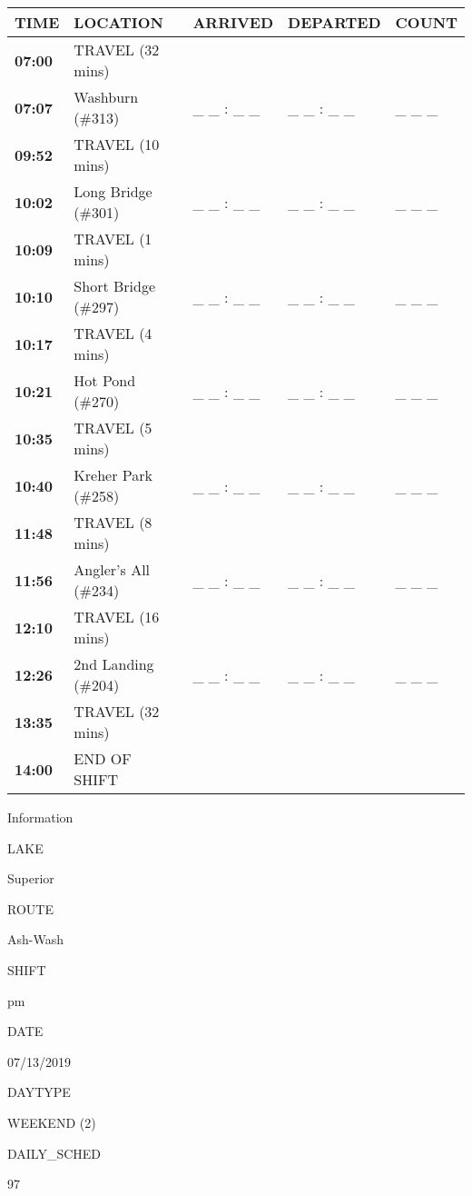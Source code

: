 \documentclass[]{article}
\begin{document}
\begin{tabular}{>{\bfseries}lllll}
\toprule
\textbf{TIME} & \textbf{LOCATION} & \textbf{ARRIVED} & \textbf{DEPARTED} & \textbf{COUNT}\\
\midrule
07:00 & TRAVEL (32 mins) &  &  & \\
07:07 & Washburn (\#313) & \_ \_ : \_ \_ & \_ \_ : \_ \_ & \_ \_ \_\\
09:52 & TRAVEL (10 mins) &  &  & \\
10:02 & Long Bridge (\#301) & \_ \_ : \_ \_ & \_ \_ : \_ \_ & \_ \_ \_\\
10:09 & TRAVEL (1 mins) &  &  & \\
10:10 & Short Bridge (\#297) & \_ \_ : \_ \_ & \_ \_ : \_ \_ & \_ \_ \_\\
10:17 & TRAVEL (4 mins) &  &  & \\
10:21 & Hot Pond (\#270) & \_ \_ : \_ \_ & \_ \_ : \_ \_ & \_ \_ \_\\
10:35 & TRAVEL (5 mins) &  &  & \\
10:40 & Kreher Park (\#258) & \_ \_ : \_ \_ & \_ \_ : \_ \_ & \_ \_ \_\\
11:48 & TRAVEL (8 mins) &  &  & \\
11:56 & Angler's All (\#234) & \_ \_ : \_ \_ & \_ \_ : \_ \_ & \_ \_ \_\\
12:10 & TRAVEL (16 mins) &  &  & \\
12:26 & 2nd Landing (\#204) & \_ \_ : \_ \_ & \_ \_ : \_ \_ & \_ \_ \_\\
13:35 & TRAVEL (32 mins) &  &  & \\
14:00 & END OF SHIFT &  &  & \\
\bottomrule
\end{tabular}\newpage

Information

LAKE

Superior

ROUTE

Ash-Wash

SHIFT

pm

DATE

07/13/2019

DAYTYPE

WEEKEND (2)

DAILY\_SCHED

97

\vspace{24pt}
\end{document}
